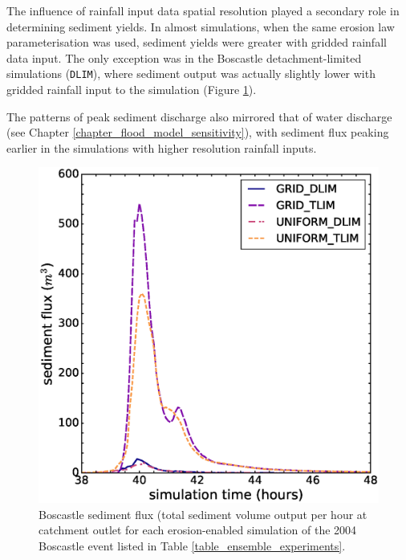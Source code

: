 The influence of rainfall input data spatial resolution played a secondary role in determining sediment yields. In almost simulations, when the same erosion law parameterisation was used, sediment yields were greater with gridded rainfall data input. The only exception was in the Boscastle detachment-limited simulations (\texttt{DLIM}), where sediment output was actually slightly lower with gridded rainfall input to the simulation (Figure \ref{fig_boscastle_sedigraph_ensemble}).

The patterns of peak sediment discharge also mirrored that of water discharge (see Chapter \ref{chapter_flood_model_sensitivity}), with sediment flux peaking earlier in the simulations with higher resolution rainfall inputs. 

\begin{figure}[t]
\includegraphics[width=14cm]{chp06_figures_scripts/figure_boscastle_sedigraph_ensemble.eps}
\caption{Boscastle sediment flux (total sediment volume output per hour at catchment outlet for each erosion-enabled simulation of the 2004 Boscastle event listed in Table \ref{table_ensemble_experiments}.}
\label{fig_boscastle_sedigraph_ensemble}
\end{figure}


